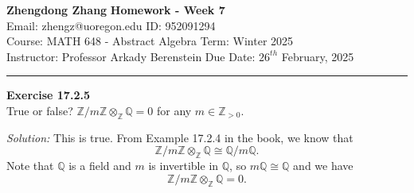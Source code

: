 \documentclass[a4paper, 12pt]{article}
\newenvironment{problem}[2][Exercise]
    { \begin{mdframed}[backgroundcolor=gray!20] \textbf{#1 #2} \\}
    {  \end{mdframed}}
\newenvironment{solution}
    {\textit{Solution:}}
    {}
\begin{document}
\noindent
\large\textbf{Zhengdong Zhang} \hfill \textbf{Homework - Week 7}   \\
Email: zhengz@uoregon.edu \hfill ID: 952091294 \\
\normalsize Course: MATH 648 - Abstract Algebra  \hfill Term: Winter 2025\\
Instructor: Professor Arkady Berenstein \hfill Due Date: $26^{th}$ February, 2025 \\
\noindent\rule{7in}{2.8pt}
\begin{problem}{17.2.5}
True or false? \(\mathbb{Z}/m \mathbb{Z}\otimes_{\mathbb{Z}}\mathbb{Q}=0\) for any \(m\in \mathbb{Z}_{>0}\).
\end{problem}
\begin{solution}
This is true. From Example 17.2.4 in the book, we know that 
\[\mathbb{Z}/m \mathbb{Z}\otimes_\mathbb{Z}\mathbb{Q}\cong \mathbb{Q}/m \mathbb{Q}.\]
Note that \(\mathbb{Q}\) is a field and \(m\) is invertible in \(\mathbb{Q}\), so \(m \mathbb{Q}\cong \mathbb{Q}\) and we have 
\[\mathbb{Z}/ m \mathbb{Z}\otimes_\mathbb{Z}\mathbb{Q}=0.\]
\end{solution}
\end{document}
